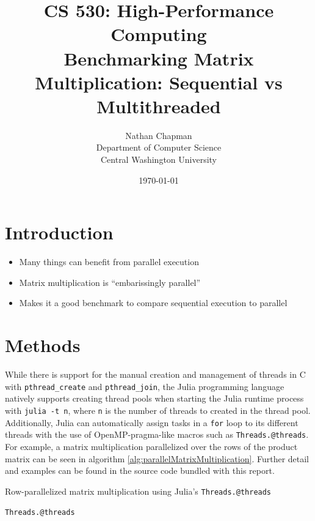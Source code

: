 \documentclass{article}
\title{\Large \vspace{-0.5in} CS 530: High-Performance Computing \\ Benchmarking Matrix Multiplication: Sequential vs Multithreaded \vspace{-0.25in}}
\author{Nathan Chapman \vspace{-0.05in} \\ \normalsize Department of Computer Science \vspace{-0.15in} \\ \normalsize Central Washington University}
\date{\normalsize \vspace{-0.15in}\today}
\begin{document}
\maketitle
\tableofcontents

\section{Introduction}

    \begin{itemize}
        \item Many things can benefit from parallel execution
        \item Matrix multiplication is ``embarissingly parallel''
        \item Makes it a good benchmark to compare sequential execution to parallel
    \end{itemize}

\section{Methods}

    While there is support for the manual creation and management of threads in C with \verb|pthread_create| and \verb|pthread_join|, the Julia programming language natively supports creating thread pools when starting the Julia runtime process with \verb|julia -t n|, where \verb|n| is the number of threads to created in the thread pool.  Additionally, Julia can automatically assign tasks in a \verb|for| loop to its different threads with the use of OpenMP-pragma-like macros such as \verb|Threads.@threads|.  For example, a matrix multiplication parallelized over the rows of the product matrix can be seen in algorithm \ref{alg:parallelMatrixMultiplication}.  Further detail and examples can be found in the source code bundled with this report.

    \begin{algorithm}[h]
        \caption{Row-parallelized matrix multiplication using Julia's \texttt{Threads.@threads}}
        \texttt{Threads.@threads} 
        \label{alg:parallelMatrixMultiplication}
    \end{algorithm}
\end{document}
